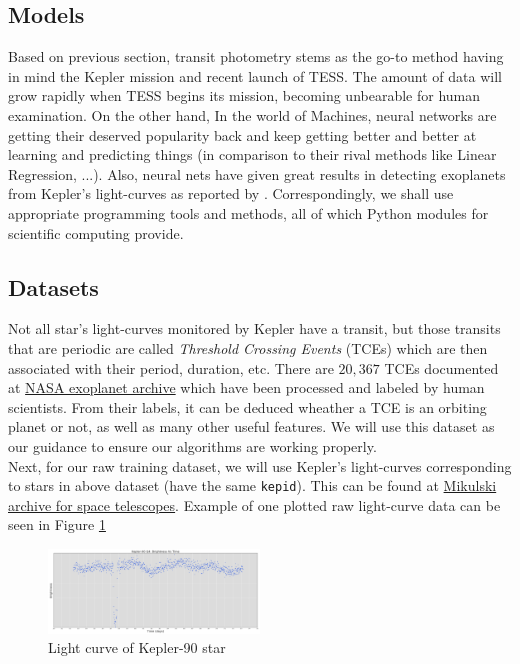\documentclass[twoside]{article}
\newcommand{\code}[1]{\texttt{#1}}
\begin{document}
\begin{multicols}{2}
\subsection{Models}
Based on previous section, transit photometry stems as the go-to method having in mind the Kepler mission and recent launch of TESS.
The amount of data will grow rapidly when TESS begins its mission, becoming unbearable for human examination. On the other hand, In the world of Machines, neural networks are getting their deserved popularity back and keep getting better and better at learning and predicting things (in comparison to their rival methods like Linear Regression, ...). Also, neural nets have given great results in detecting exoplanets from Kepler's light-curves as reported by \cite{Shallue:2017}. Correspondingly, we shall use appropriate programming tools and methods, all of which Python modules for scientific computing provide.

\subsection{Datasets}
Not all star's light-curves monitored by Kepler have a transit, but those transits that are periodic are called \textit{Threshold Crossing Events} (TCEs) which are then associated with their period, duration, etc. There are $20,367$ TCEs documented at \href{https://exoplanetarchive.ipac.caltech.edu/cgi-bin/TblView/nph-tblView?app=ExoTbls&config=q1_q17_dr24_tce}{NASA exoplanet archive} which have been processed and labeled by human scientists. From their labels, it can be deduced wheather a TCE is an orbiting planet or not, as well as many other useful features. We will use this dataset as our guidance to ensure our algorithms are working properly.\\
Next, for our raw training dataset, we will use Kepler's light-curves corresponding to stars in above dataset (have the same \code{kepid}). This can be found at \href{https://archive.stsci.edu/}{Mikulski archive for space telescopes}. Example of one plotted raw light-curve data can be seen in Figure \ref{fig:k90lc}
\begin{figure}[H]
\includegraphics[width=0.5\textwidth]{kep90-q4-raw}
\caption{Light curve of Kepler-90 star}
\label{fig:k90lc}
\end{figure}


\end{multicols}
\end{document}
